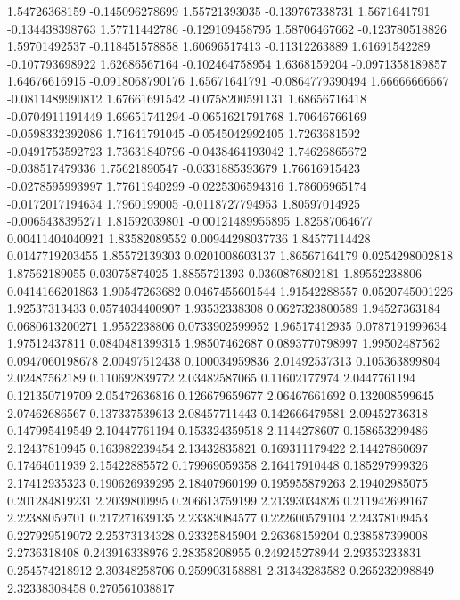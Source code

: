   1.54726368159  -0.145096278699
  1.55721393035  -0.139767338731
   1.5671641791  -0.134438398763
  1.57711442786  -0.129109458795
  1.58706467662  -0.123780518826
  1.59701492537  -0.118451578858
  1.60696517413   -0.11312263889
  1.61691542289  -0.107793698922
  1.62686567164  -0.102464758954
   1.6368159204  -0.0971358189857
  1.64676616915  -0.0918068790176
  1.65671641791  -0.0864779390494
  1.66666666667  -0.0811489990812
  1.67661691542  -0.0758200591131
  1.68656716418  -0.0704911191449
  1.69651741294  -0.0651621791768
  1.70646766169  -0.0598332392086
  1.71641791045  -0.0545042992405
   1.7263681592  -0.0491753592723
  1.73631840796  -0.0438464193042
  1.74626865672  -0.038517479336
  1.75621890547  -0.0331885393679
  1.76616915423  -0.0278595993997
  1.77611940299  -0.0225306594316
  1.78606965174  -0.0172017194634
   1.7960199005  -0.0118727794953
  1.80597014925  -0.0065438395271
  1.81592039801  -0.00121489955895
  1.82587064677  0.00411404040921
  1.83582089552  0.00944298037736
  1.84577114428  0.0147719203455
  1.85572139303  0.0201008603137
  1.86567164179  0.0254298002818
  1.87562189055    0.03075874025
   1.8855721393  0.0360876802181
  1.89552238806  0.0414166201863
  1.90547263682  0.0467455601544
  1.91542288557  0.0520745001226
  1.92537313433  0.0574034400907
  1.93532338308  0.0627323800589
  1.94527363184  0.0680613200271
   1.9552238806  0.0733902599952
  1.96517412935  0.0787191999634
  1.97512437811  0.0840481399315
  1.98507462687  0.0893770798997
  1.99502487562  0.0947060198678
  2.00497512438   0.100034959836
  2.01492537313   0.105363899804
  2.02487562189   0.110692839772
  2.03482587065    0.11602177974
   2.0447761194   0.121350719709
  2.05472636816   0.126679659677
  2.06467661692   0.132008599645
  2.07462686567   0.137337539613
  2.08457711443   0.142666479581
  2.09452736318   0.147995419549
  2.10447761194   0.153324359518
   2.1144278607   0.158653299486
  2.12437810945   0.163982239454
  2.13432835821   0.169311179422
  2.14427860697    0.17464011939
  2.15422885572   0.179969059358
  2.16417910448   0.185297999326
  2.17412935323   0.190626939295
  2.18407960199   0.195955879263
  2.19402985075   0.201284819231
   2.2039800995   0.206613759199
  2.21393034826   0.211942699167
  2.22388059701   0.217271639135
  2.23383084577   0.222600579104
  2.24378109453   0.227929519072
  2.25373134328    0.23325845904
  2.26368159204   0.238587399008
   2.2736318408   0.243916338976
  2.28358208955   0.249245278944
  2.29353233831   0.254574218912
  2.30348258706   0.259903158881
  2.31343283582   0.265232098849
  2.32338308458   0.270561038817
